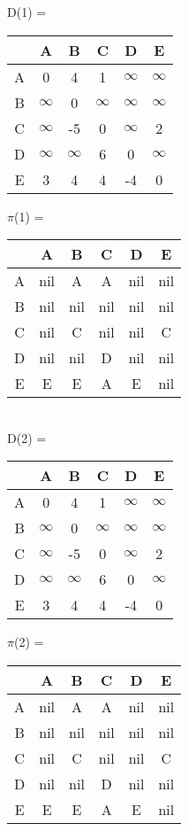 \documentclass{article}
\begin{document}
D(1) = 
\begin{tabular}{ c | c | c | c | c | c }        
    
    & A & B & C & D & E \\ 
    \hline
  A & 0 & 4 & 1 & $\infty$ & $\infty$ \\  
    \hline
  B & $\infty$ & 0 & $\infty$ & $\infty$ & $\infty$ \\
    \hline
  C & $\infty$ & -5 & 0 & $\infty$ & 2 \\
    \hline
  D & $\infty$ & $\infty$ & 6 & 0 & $\infty$ \\     
    \hline
  E & 3 & 4 & 4 & -4 & 0 \\

\end{tabular}
${\pi}$(1) =
\begin{tabular}{ c | c | c | c | c | c }        
    
    & A & B & C & D & E \\ 
    \hline
  A & nil & A & A & nil & nil \\  
    \hline
  B & nil & nil & nil & nil & nil \\
    \hline
  C & nil & C & nil & nil & C \\
    \hline
  D & nil & nil & D & nil & nil \\     
    \hline
  E & E & E & A & E & nil \\

\end{tabular}\\

D(2) = 
\begin{tabular}{ c | c | c | c | c | c }        
    
    & A & B & C & D & E \\ 
    \hline
  A & 0 & 4 & 1 & $\infty$ & $\infty$ \\  
    \hline
  B & $\infty$ & 0 & $\infty$ & $\infty$ & $\infty$ \\
    \hline
  C & $\infty$ & -5 & 0 & $\infty$ & 2 \\
    \hline
  D & $\infty$ & $\infty$ & 6 & 0 & $\infty$ \\     
    \hline
  E & 3 & 4 & 4 & -4 & 0 \\

\end{tabular}
${\pi}$(2) =
\begin{tabular}{ c | c | c | c | c | c }        
    
    & A & B & C & D & E \\ 
    \hline
  A & nil & A & A & nil & nil \\  
    \hline
  B & nil & nil & nil & nil & nil \\
    \hline
  C & nil & C & nil & nil & C \\
    \hline
  D & nil & nil & D & nil & nil \\     
    \hline
  E & E & E & A & E & nil \\

\end{tabular}\\
\end{document}
